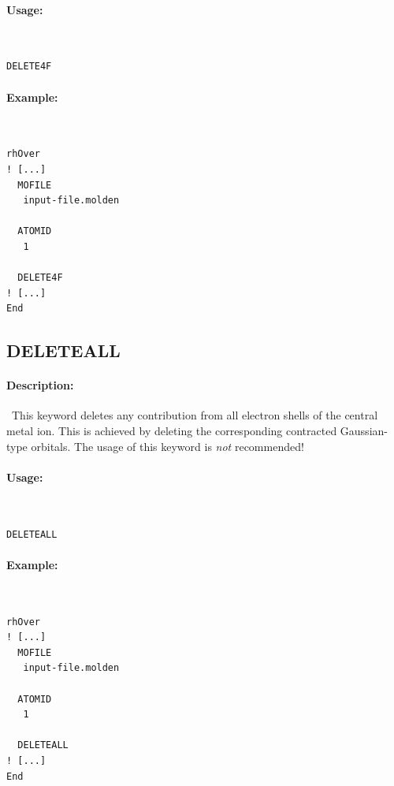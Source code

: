 \documentclass[11pt]{article}
\begin{document}
\paragraph{Usage:}~ 

\begin{lstlisting}[frame=single]
  DELETE4F
\end{lstlisting}

\paragraph{Example:}~ 

\begin{lstlisting}[frame=single]
rhOver
! [...]
  MOFILE
   input-file.molden
  
  ATOMID
   1
  
  DELETE4F
! [...]
End
\end{lstlisting}

\clearpage
\subsection{DELETEALL}

\paragraph{Description:}~This keyword deletes any contribution from all electron shells of the central metal ion. This is achieved by deleting the corresponding contracted Gaussian-type orbitals. The usage of this keyword is \emph{not} recommended!

\paragraph{Usage:}~ 

\begin{lstlisting}[frame=single]
  DELETEALL
\end{lstlisting}

\paragraph{Example:}~ 

\begin{lstlisting}[frame=single]
rhOver
! [...]
  MOFILE
   input-file.molden
  
  ATOMID
   1
  
  DELETEALL
! [...]
End
\end{lstlisting}
\end{document}
